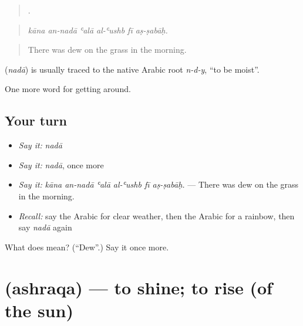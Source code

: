 \begin{quote}
     .
\end{quote}

\begin{quote}
\emph{kāna an-nadā ʿalā al-ʿushb fī aṣ-ṣabāḥ.}
\end{quote}

\begin{quote}
There was dew on the grass in the morning.
\end{quote}

\begin{cousinweb}
\textbf{} (\emph{nadā}) is usually traced to the native Arabic root \emph{n-d-y}, \textquotedblleft{}to be moist\textquotedblright{}.
\end{cousinweb}

\begin{grammarlens}[title={What you've built}]
One more word for getting around.
\end{grammarlens}

\subsection*{Your turn}
\begin{itemize}
\raggedright
  \item \emph{Say it:} \emph{nadā}
  \item \emph{Say it:} \emph{nadā}, once more
  \item \emph{Say it:} \emph{kāna an-nadā ʿalā al-ʿushb fī aṣ-ṣabāḥ.} — There was dew on the grass in the morning.
  \item \emph{Recall:} say the Arabic for clear weather, then the Arabic for a rainbow, then say \emph{nadā} again
\end{itemize}

\begin{tcolorbox}[breakable,colback=teal!4,colframe=teal!35!black,title={Before you move on}]
What does  mean? (\textquotedblleft{}Dew\textquotedblright{}.) Say it once more.
\end{tcolorbox}
\section[\texorpdfstring{\ar{أشرق} (ashraqa)}{أشرق (ashraqa)}]{ (ashraqa) — to shine; to rise (of the sun)}

\label{lesson:AR-C485-ashraqa}



